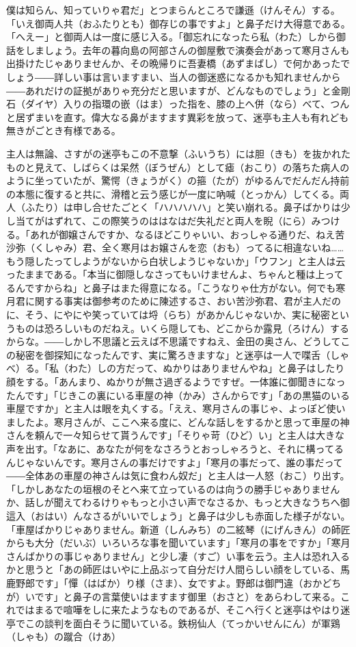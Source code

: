 \documentclass{book}
\begin{document}
僕は知らん、知っていりゃ君だ」とつまらんところで謙遜（けんそん）する。「いえ御両人共（おふたりとも）御存じの事ですよ」と鼻子だけ大得意である。「へえー」と御両人は一度に感じ入る。「御忘れになったら私（わた）しから御話をしましょう。去年の暮向島の阿部さんの御屋敷で演奏会があって寒月さんも出掛けたじゃありませんか、その晩帰りに吾妻橋（あずまばし）で何かあったでしょう――詳しい事は言いますまい、当人の御迷惑になるかも知れませんから――あれだけの証拠がありゃ充分だと思いますが、どんなものでしょう」と金剛石（ダイヤ）入りの指環の嵌（はま）った指を、膝の上へ併（なら）べて、つんと居ずまいを直す。偉大なる鼻がますます異彩を放って、迷亭も主人も有れども無きがごとき有様である。

主人は無論、さすがの迷亭もこの不意撃（ふいうち）には胆（きも）を抜かれたものと見えて、しばらくは呆然（ぼうぜん）として瘧（おこり）の落ちた病人のように坐っていたが、驚愕（きょうがく）の箍（たが）がゆるんでだんだん持前の本態に復すると共に、滑稽と云う感じが一度に吶喊（とっかん）してくる。両人（ふたり）は申し合せたごとく「ハハハハハ」と笑い崩れる。鼻子ばかりは少し当てがはずれて、この際笑うのははなはだ失礼だと両人を睨（にら）みつける。「あれが御嬢さんですか、なるほどこりゃいい、おっしゃる通りだ、ねえ苦沙弥（くしゃみ）君、全く寒月はお嬢さんを恋（おも）ってるに相違ないね\ldots{}\ldots{}もう隠したってしようがないから白状しようじゃないか」「ウフン」と主人は云ったままである。「本当に御隠しなさってもいけませんよ、ちゃんと種は上ってるんですからね」と鼻子はまた得意になる。「こうなりゃ仕方がない。何でも寒月君に関する事実は御参考のために陳述するさ、おい苦沙弥君、君が主人だのに、そう、にやにや笑っていては埒（らち）があかんじゃないか、実に秘密というものは恐ろしいものだねえ。いくら隠しても、どこからか露見（ろけん）するからな。――しかし不思議と云えば不思議ですねえ、金田の奥さん、どうしてこの秘密を御探知になったんです、実に驚ろきますな」と迷亭は一人で喋舌（しゃべ）る。「私（わた）しの方だって、ぬかりはありませんやね」と鼻子はしたり顔をする。「あんまり、ぬかりが無さ過ぎるようですぜ。一体誰に御聞きになったんです」「じきこの裏にいる車屋の神（かみ）さんからです」「あの黒猫のいる車屋ですか」と主人は眼を丸くする。「ええ、寒月さんの事じゃ、よっぽど使いましたよ。寒月さんが、ここへ来る度に、どんな話しをするかと思って車屋の神さんを頼んで一々知らせて貰うんです」「そりゃ苛（ひど）い」と主人は大きな声を出す。「なあに、あなたが何をなさろうとおっしゃろうと、それに構ってるんじゃないんです。寒月さんの事だけですよ」「寒月の事だって、誰の事だって――全体あの車屋の神さんは気に食わん奴だ」と主人は一人怒（おこ）り出す。「しかしあなたの垣根のそとへ来て立っているのは向うの勝手じゃありませんか、話しが聞えてわるけりゃもっと小さい声でなさるか、もっと大きなうちへ御這入（おはい）んなさるがいいでしょう」と鼻子は少しも赤面した様子がない。「車屋ばかりじゃありません。新道（しんみち）の二絃琴（にげんきん）の師匠からも大分（だいぶ）いろいろな事を聞いています」「寒月の事をですか」「寒月さんばかりの事じゃありません」と少し凄（すご）い事を云う。主人は恐れ入るかと思うと「あの師匠はいやに上品ぶって自分だけ人間らしい顔をしている、馬鹿野郎です」「憚（はばか）り様（さま）、女ですよ。野郎は御門違（おかどちが）いです」と鼻子の言葉使いはますます御里（おさと）をあらわして来る。これではまるで喧嘩をしに来たようなものであるが、そこへ行くと迷亭はやはり迷亭でこの談判を面白そうに聞いている。鉄枴仙人（てっかいせんにん）が軍鶏（しゃも）の蹴合（けあ）
\end{document}
